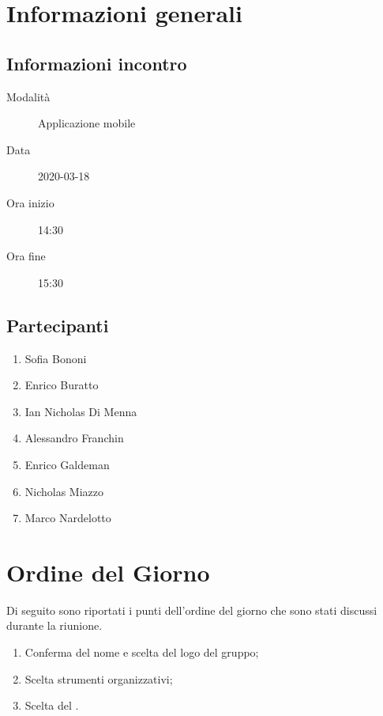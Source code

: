\documentclass{article}
\begin{document}


\section{Informazioni generali}%
\label{sec:informazioni_generali}

\subsection{Informazioni incontro}%
\label{sub:informazioni_incontro}

\begin{description}
  \item[Modalità] Applicazione mobile 
  \item[Data] 2020-03-18
  \item[Ora inizio] 14:30
  \item[Ora fine] 15:30
\end{description}

\subsection{Partecipanti}%
\label{sub:partecipanti}

\begin{enumerate}
  \item Sofia Bononi
  \item Enrico Buratto
  \item Ian Nicholas Di Menna
  \item Alessandro Franchin
  \item Enrico Galdeman
  \item Nicholas Miazzo
  \item Marco Nardelotto
\end{enumerate}

\section{Ordine del Giorno}%
\label{ordine_del_giorno}
Di seguito sono riportati i punti dell'ordine del giorno che sono stati discussi durante la riunione.
\begin{enumerate}
  \item Conferma del nome e scelta del logo del gruppo;
  \item Scelta strumenti organizzativi;
  \item Scelta del .
\end{enumerate}
\end{document}
